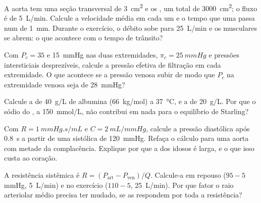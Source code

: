 \begin{exercise}[$\star\star$]\label{exo:b2:blood-circulation:7}
A aorta tem uma seção transversal de \qty{3}{cm^2} e os , um
total de \qty{3000}{cm^2}; o fluxo é de \qty{5}{L/min}. Calcule a
velocidade média em cada um e o tempo que uma  passa num 
de \qty{1}{mm}. Durante o exercício, o débito sobe para
\qty{25}{L/min} e os  musculares se abrem: o que acontece com
o tempo de trânsito?
\end{exercise}

\begin{exercise}[$\star\star$]\label{exo:b2:blood-circulation:8}
Com $P_c = 35$ e \qty{15}{mmHg} nas duas extremidades, $\pi_c =
\qty{25}{mmHg}$ e pressões intersticiais desprezíveis, calcule
a pressão efetiva de filtração em cada extremidade. O que acontece se a
pressão venosa subir de modo que $P_c$ na extremidade venosa seja de
\qty{28}{mmHg}?
\end{exercise}

\begin{exercise}[$\star\star$]\label{exo:b2:blood-circulation:9}
Calcule a  de \qty{40}{g/L} de albumina
(\qty{66}{kg/mol}) a \qty{37}{\celsius}, e a de \qty{20}{g/L}. Por que
o sódio do , a \qty{150}{mmol/L}, não contribui em nada para o
equilíbrio de Starling?
\end{exercise}

\begin{exercise}[$\star\star\star$]\label{exo:b2:blood-circulation:10}
Com $R = \qty{1}{mmHg.s/mL}$ e $C = \qty{2}{mL/mmHg}$, calcule a pressão
diastólica após \qty{0.8}{s} a partir de uma sistólica de
\qty{120}{mmHg}. Refaça o cálculo para uma aorta com metade da
complacência. Explique por que a  dos idosos é larga, e
o que isso custa ao coração.
\end{exercise}

\begin{exercise}[$\star\star\star$]\label{exo:b2:blood-circulation:11}
A resistência sistêmica é $R = (P_{\text{art}} - P_{\text{ven}})/Q$.
Calcule-a em repouso ($95 - 5$ mmHg, \qty{5}{L/min}) e no exercício
($110 - 5$, \qty{25}{L/min}). Por que fator o raio arteriolar médio
precisa ter mudado, se as  respondem por toda a resistência?
\end{exercise}

